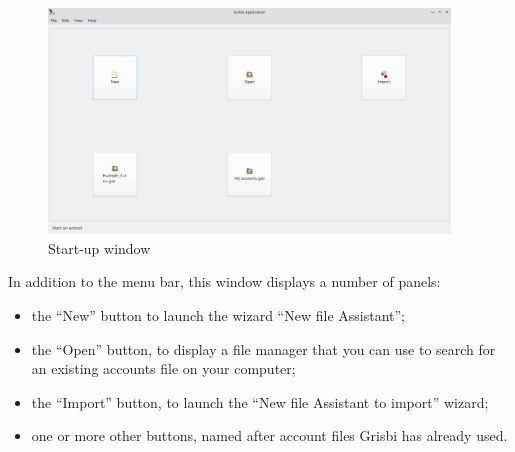 \begin{figure}[htbp]			%
	\begin{center}					%
		\includegraphics[width=0.95\textwidth]{image/screenshot/home_start_grisbi}		%
	\end{center}
	\caption{Start-up window}%
	\label{home_start_grisbi}					%
\end{figure}


In addition to the menu bar, this window displays a number of panels:%

\begin{itemize}
	\item the \enquote{New} button to launch the wizard \enquote{New file Assistant};%
	\item the \enquote{Open} button, to display a file manager that you can use to search for an existing accounts file on your computer;%
	\item the \enquote{Import} button, to launch the \enquote{New file Assistant to import} wizard;%
	\item one or more other buttons, named after account files Grisbi has already used.%
\end{itemize}

